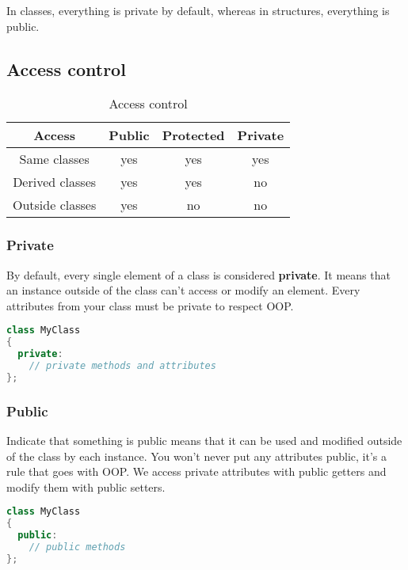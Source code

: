 \documentclass[a4paper, 12pt, titlepage]{scrartcl} %
\begin{document}
In classes, everything is private by default, whereas in structures, everything is public.


\subsection{Access control}
\begin{table}[h]
\begin{center}
{\renewcommand{\arraystretch}{2} %
{\setlength{\tabcolsep}{1cm} %
\begin{tabular}{|c|c|c|c|}
  \hline
  Access & Public & Protected & Private \\
  \hline
  Same classes & yes & yes & yes \\
  \hline
  Derived classes & yes & yes & no \\
  \hline
  Outside classes & yes & no & no \\
  \hline
\end{tabular}}}
\end{center}
\caption{Access control}
\end{table} \vspace{5mm}


\subsubsection{Private}
By default, every single element of a class is considered \textbf{private}. It means that an instance outside of the class can't access or modify an element. Every attributes from your class must be private to respect OOP.

\begin{lstlisting}[language=C++]
class MyClass
{
  private:
    // private methods and attributes
};
\end{lstlisting} \vspace{5mm}

\subsubsection{Public}
Indicate that something is public means that it can be used and modified outside of the class by each instance. You won't never put any attributes public, it's a rule that goes with OOP. We access private attributes with public getters and modify them with public setters.

\begin{lstlisting}[language=C++]
class MyClass
{
  public:
    // public methods
};
\end{lstlisting} \vspace{5mm}
\end{document}
